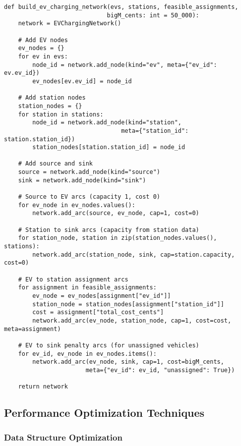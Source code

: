 \documentclass[12pt,a4paper]{article}
\begin{document}
\begin{lstlisting}[caption=Bipartite Network Construction]
def build_ev_charging_network(evs, stations, feasible_assignments, 
                             bigM_cents: int = 50_000):
    network = EVChargingNetwork()
    
    # Add EV nodes
    ev_nodes = {}
    for ev in evs:
        node_id = network.add_node(kind="ev", meta={"ev_id": ev.ev_id})
        ev_nodes[ev.ev_id] = node_id
    
    # Add station nodes
    station_nodes = {}
    for station in stations:
        node_id = network.add_node(kind="station", 
                                 meta={"station_id": station.station_id})
        station_nodes[station.station_id] = node_id
    
    # Add source and sink
    source = network.add_node(kind="source")
    sink = network.add_node(kind="sink")
    
    # Source to EV arcs (capacity 1, cost 0)
    for ev_node in ev_nodes.values():
        network.add_arc(source, ev_node, cap=1, cost=0)
    
    # Station to sink arcs (capacity from station data)
    for station_node, station in zip(station_nodes.values(), stations):
        network.add_arc(station_node, sink, cap=station.capacity, cost=0)
    
    # EV to station assignment arcs
    for assignment in feasible_assignments:
        ev_node = ev_nodes[assignment["ev_id"]]
        station_node = station_nodes[assignment["station_id"]]
        cost = assignment["total_cost_cents"]
        network.add_arc(ev_node, station_node, cap=1, cost=cost, meta=assignment)
    
    # EV to sink penalty arcs (for unassigned vehicles)
    for ev_id, ev_node in ev_nodes.items():
        network.add_arc(ev_node, sink, cap=1, cost=bigM_cents, 
                       meta={"ev_id": ev_id, "unassigned": True})
    
    return network
\end{lstlisting}

\subsection{Performance Optimization Techniques}

\subsubsection{Data Structure Optimization}
\end{document}
